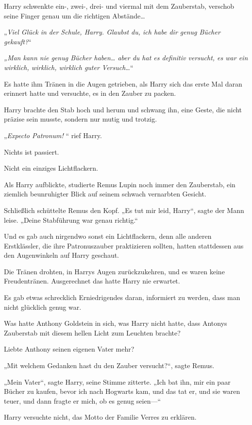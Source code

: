 {Harry schwenkte ein-, zwei-, drei- und viermal mit dem Zauberstab, verschob seine Finger genau um die richtigen Abstände…

„\emph{Viel Glück in der Schule, Harry. Glaubst du, ich habe dir genug Bücher gekauft?}“

\emph{„\emph{Man kann nie genug Bücher haben… aber du hat es} \emph{definitiv} \emph{versucht, es war ein wirklich, wirklich, wirklich guter Versuch…}}“

Es hatte ihm Tränen in die Augen getrieben, als Harry sich das erste Mal daran erinnert hatte und versuchte, es in den Zauber zu packen.

Harry brachte den Stab hoch und herum und schwang ihn, eine Geste, die nicht präzise sein musste, sondern nur mutig und trotzig.

„\emph{Expecto Patronum!} “ rief Harry.

Nichts ist passiert.

Nicht ein einziges Lichtflackern.

Als Harry aufblickte, studierte Remus Lupin noch immer den Zauberstab, ein ziemlich beunruhigter Blick auf seinem schwach vernarbten Gesicht.

Schließlich schüttelte Remus den Kopf. „Es tut mir leid, Harry“, sagte der Mann leise. „Deine Stabführung war genau richtig.“

Und es gab auch nirgendwo sonst ein Lichtflackern, denn alle anderen Erstklässler, die ihre Patronuszauber praktizieren sollten, hatten stattdessen aus den Augenwinkeln auf Harry geschaut.

Die Tränen drohten, in Harrys Augen zurückzukehren, und es waren keine Freudentränen. Ausgerechnet das hatte Harry nie erwartet.

Es gab etwas schrecklich Erniedrigendes daran, informiert zu werden, dass man nicht glücklich genug war.

Was hatte Anthony Goldstein in sich, was Harry nicht hatte, dass Antonys Zauberstab mit diesem hellen Licht zum Leuchten brachte?

Liebte Anthony seinen eigenen Vater mehr?

„Mit welchem Gedanken hast du den Zauber versucht?“, sagte Remus.

„Mein Vater“, sagte Harry, seine Stimme zitterte. „Ich bat ihn, mir ein paar Bücher zu kaufen, bevor ich nach Hogwarts kam, und das tat er, und sie waren teuer, und dann fragte er mich, ob es genug seien—“

Harry versuchte nicht, das Motto der Familie Verres zu erklären.

}
